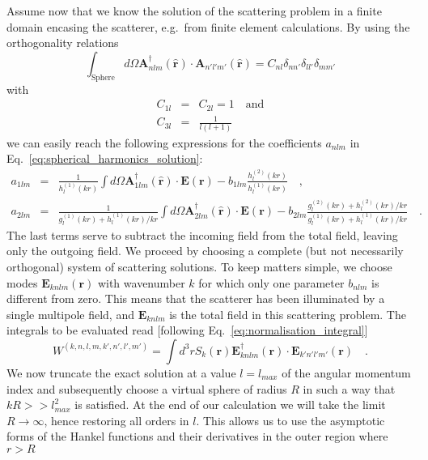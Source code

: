 \documentclass[10pt,letterpaper]{article}
\renewcommand{\vec}[1]{\mathbf{#1}}
\let\oldhat\hat
\renewcommand{\hat}[1]{\oldhat{\vec{#1}}}
\begin{document}
Assume now that we know the solution of the scattering problem in a finite domain encasing the scatterer, e.g.~from finite element calculations. By using the orthogonality relations
\begin{equation}
\int_{\text{Sphere}} d\Omega \vec{A}_{nlm}^\dagger\left(\hat{r}\right)\cdot\vec{A}_{n'l'm'}\left(\hat{r}\right) = C_{nl}\delta_{nn'}\delta_{ll'}\delta_{mm'}\label{eq:spherical_harmonics_orthogonality}
\end{equation}
with
\begin{eqnarray}
C_{1l} &=& C_{2l} = 1 \quad \mathrm{and} \nonumber \\
C_{3l} &=& \frac{1}{l(l+1)}
\end{eqnarray}
we can easily reach the following expressions for the coefficients $a_{nlm}$  in Eq.~\eqref{eq:spherical_harmonics_solution}: 
\begin{eqnarray}
a_{1lm} &=& \frac{1}{h_l^{(1)}\left(kr\right)}\int d\Omega \vec{A}_{1lm}^\dagger\left(\hat{r}\right) \cdot \vec{E}\left(\vec{r}\right) - b_{1lm}\frac{h_l^{(2)}\left(kr\right)}{h_l^{(1)}\left(kr\right)} \quad ,\nonumber \\
a_{2lm} &=& \frac{1}{g_l^{(1)}\left(kr\right)+h_l^{(1)}\left(kr\right)/kr}\int d\Omega \vec{A}_{2lm}^\dagger\left(\hat{r}\right) \cdot \vec{E}\left(\vec{r}\right) - b_{2lm}\frac{g_l^{(2)}\left(kr\right)+h_l^{(2)}\left(kr\right)/kr}{g_l^{(1)}\left(kr\right)+h_l^{(1)}\left(kr\right)/kr} \quad .
\end{eqnarray}
The last terms serve to subtract the incoming field from the total field, leaving only the outgoing field. We proceed by choosing a complete (but not necessarily orthogonal) system of scattering solutions. To keep matters simple, we choose modes $\vec{E}_{knlm}(\vec{r})$ with wavenumber $k$ for which only one parameter $b_{nlm}$ is different from zero. This means that the scatterer has been illuminated by a single multipole field, and $\vec{E}_{knlm}$ is the total field in this scattering problem. The integrals to be evaluated read [following Eq.~\eqref{eq:normalisation_integral}]
\begin{equation} \label{eq:norm_integral}
W^{(k,n,l,m,k',n',l',m')} = \int d^{3}rS_k(\vec{r})\vec{E}_{knlm}^{\dagger}(\vec{r})\cdot\vec{E}_{k'n'l'm'}(\vec{r}) \quad .
\end{equation}
We now truncate the exact solution at a value $l = l_{max}$ of the angular momentum index and subsequently choose a virtual sphere of radius $R$ in such a way that $kR >> l_{max}^2$ is satisfied. At the end of our calculation we will take the limit $R\rightarrow\infty$, hence restoring all orders in $l$. This allows us to use the asymptotic forms of the Hankel functions and their derivatives in the outer region where $r>R$ \cite{Bohren1998}
\end{document}

